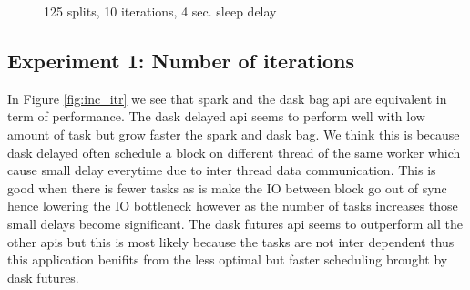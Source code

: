 \documentclass[11pt,a4paper]{article}
\begin{document}
\begin{figure}[htp]
    \centering
    
    \caption{125 splits, 10 iterations, 4 sec. sleep delay}
    \label{fig:inc_worker}
\end{figure}



\subsection{Experiment 1: Number of iterations}
In Figure \ref{fig:inc_itr} we see that spark and the dask bag api are equivalent in
term of performance. The dask delayed api seems to perform well with low amount of
task but grow faster the spark and dask bag. We think this is because dask delayed
often schedule a block on different thread of the same worker which cause small delay
everytime due to inter thread data communication. This is good when there is fewer
tasks as is make the IO between block go out of sync hence lowering the IO bottleneck
however as the number of tasks increases those small delays become significant. The
dask futures api seems to outperform all the other apis but this is most likely
because the tasks are not inter dependent thus this application benifits from the
less optimal but faster scheduling brought by dask futures.
\end{document}
